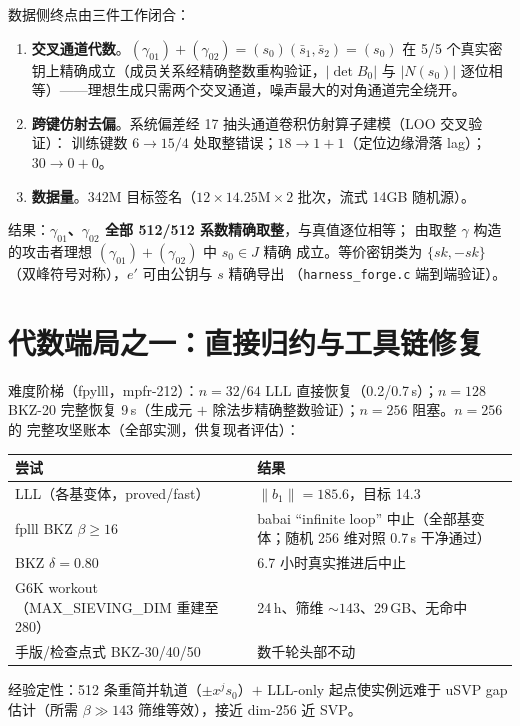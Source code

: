 \documentclass[UTF8,11pt,a4paper]{ctexart}
\newcommand{\code}[1]{\texttt{\small #1}}
\begin{document}
数据侧终点由三件工作闭合：
\begin{enumerate}
\item \textbf{交叉通道代数}。$(\gamma_{01}) + (\gamma_{02}) = (s_0)(\bar s_1, \bar s_2)
  = (s_0)$ 在 5/5 个真实密钥上精确成立（成员关系经精确整数重构验证，$|\det B_0|$ 与
  $|N(s_0)|$ 逐位相等）——理想生成只需两个交叉通道，噪声最大的对角通道完全绕开。
\item \textbf{跨键仿射去偏}。系统偏差经 17 抽头通道卷积仿射算子建模（LOO 交叉验证）：
  训练键数 $6 \to 15/4$ 处取整错误；$18 \to 1{+}1$（定位边缘滑落 lag）；$30 \to 0{+}0$。
\item \textbf{数据量}。342M 目标签名（$12 \times 14.25\mathrm{M} \times 2$ 批次，流式
  14GB 随机源）。
\end{enumerate}
结果：\textbf{$\gamma_{01}$、$\gamma_{02}$ 全部 512/512 系数精确取整}，与真值逐位相等；
由取整 $\gamma$ 构造的攻击者理想 $(\gamma_{01}) + (\gamma_{02})$ 中 $s_0 \in J$ 精确
成立。等价密钥类为 $\{sk, -sk\}$（双峰符号对称），$e'$ 可由公钥与 $s$ 精确导出
（\code{harness\_forge.c} 端到端验证）。

\section{代数端局之一：直接归约与工具链修复}

难度阶梯（fpylll，mpfr-212）：$n = 32/64$ LLL 直接恢复（0.2/0.7\,s）；$n = 128$
BKZ-20 完整恢复 9\,s（生成元 $+$ 除法步精确整数验证）；$n = 256$ 阻塞。$n = 256$ 的
完整攻坚账本（全部实测，供复现者评估）：

\begin{table}[htbp]\centering\small
\begin{tabular}{@{}ll@{}}
\toprule
尝试 & 结果 \\
\midrule
LLL（各基变体，proved/fast） & $\|b_1\| = 185.6$，目标 14.3 \\
fplll BKZ $\beta \ge 16$ & babai ``infinite loop'' 中止（全部基变体；随机 256 维对照 0.7\,s 干净通过） \\
BKZ $\delta = 0.80$ & 6.7 小时真实推进后中止 \\
G6K workout（MAX\_SIEVING\_DIM 重建至 280） & 24\,h、筛维 ${\sim}143$、29\,GB、无命中 \\
手版/检查点式 BKZ-30/40/50 & 数千轮头部不动 \\
\bottomrule
\end{tabular}
\end{table}

经验定性：512 条重简并轨道（$\pm x^j s_0$）$+$ LLL-only 起点使实例远难于 uSVP gap
估计（所需 $\beta \gg 143$ 筛维等效），接近 dim-256 近 SVP。
\end{document}
